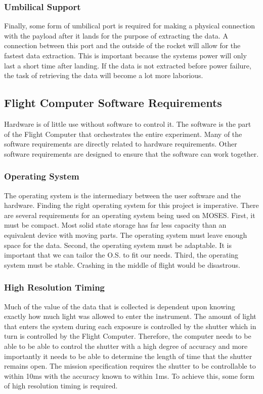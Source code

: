 \documentclass[11pt,titlepage]{article}
\begin{document}
\subsubsection{Umbilical Support}

Finally, some form of umbilical port is required for making a physical connection with the payload after it lands for the purpose of extracting the data.
A connection between this port and the outside of the rocket will allow for the fastest data extraction. This is important because the systems power will
only last a short time after landing. If the data is not extracted before power failure, the task of retrieving the data will become a lot more laborious.


\subsection{Flight Computer Software Requirements}

Hardware is of little use without software to control it. The software is the part of the Flight Computer that orchestrates the entire experiment. 
Many of the software requirements are directly related to hardware requirements. Other software
requirements are designed to ensure that the software can work together.

\subsubsection{Operating System}
The operating system is the intermediary between the user software and the hardware. Finding the right operating system for this project is imperative.
There are several requirements for an operating system being used on MOSES. First, it must be compact. Most solid state storage has far less capacity
than an equivalent device with moving parts. The operating system must leave enough space for the data. Second, the operating system must be adaptable.
It is important that we can tailor the O.S. to fit our needs. Third, the operating system must be stable. Crashing in the middle of flight would be 
disastrous.

\subsubsection{High Resolution Timing}

Much of the value of the data that is collected is dependent upon knowing exactly how much light was allowed to enter the instrument. The amount of
light that enters the system during each exposure is controlled by the shutter which in turn is controlled by the Flight Computer. Therefore, the 
computer needs to be able to be able to control the shutter with a high degree of accuracy and more importantly it needs to be able to determine the
length of time that the shutter remains open. The mission specification requires the shutter to be controllable to within 10ms with the accuracy known
to within 1ms. To achieve this, some form of high resolution timing is required.
\end{document}
